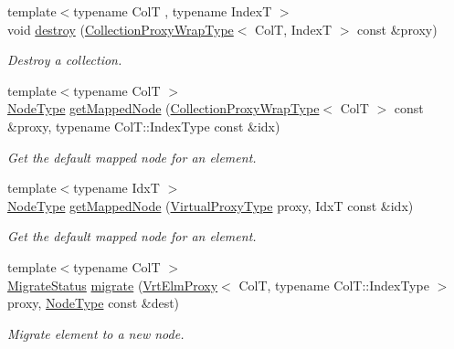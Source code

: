 \begin{DoxyCompactItemize}
{\footnotesize template$<$typename ColT , typename IndexT $>$ }\\void \hyperlink{structvt_1_1vrt_1_1collection_1_1_collection_manager_ae6e458293d04d8b29697fa0584c84c67}{destroy} (\hyperlink{structvt_1_1vrt_1_1collection_1_1_collection_manager_a56458ed7f9bb22b631b9b3a745f42f94}{Collection\+Proxy\+Wrap\+Type}$<$ ColT, IndexT $>$ const \&proxy)
\begin{DoxyCompactList}\small\item\em Destroy a collection. \end{DoxyCompactList}\item 
{\footnotesize template$<$typename ColT $>$ }\\\hyperlink{namespacevt_a866da9d0efc19c0a1ce79e9e492f47e2}{Node\+Type} \hyperlink{structvt_1_1vrt_1_1collection_1_1_collection_manager_ab92af61f5466dd4a1210bd6f2f1bb153}{get\+Mapped\+Node} (\hyperlink{structvt_1_1vrt_1_1collection_1_1_collection_manager_a56458ed7f9bb22b631b9b3a745f42f94}{Collection\+Proxy\+Wrap\+Type}$<$ ColT $>$ const \&proxy, typename Col\+T\+::\+Index\+Type const \&idx)
\begin{DoxyCompactList}\small\item\em Get the default mapped node for an element. \end{DoxyCompactList}\item 
{\footnotesize template$<$typename IdxT $>$ }\\\hyperlink{namespacevt_a866da9d0efc19c0a1ce79e9e492f47e2}{Node\+Type} \hyperlink{structvt_1_1vrt_1_1collection_1_1_collection_manager_a2356c42f2ca0effeca67b6bc2813fc29}{get\+Mapped\+Node} (\hyperlink{namespacevt_a1b417dd5d684f045bb58a0ede70045ac}{Virtual\+Proxy\+Type} proxy, IdxT const \&idx)
\begin{DoxyCompactList}\small\item\em Get the default mapped node for an element. \end{DoxyCompactList}\item 
{\footnotesize template$<$typename ColT $>$ }\\\hyperlink{namespacevt_1_1vrt_1_1collection_ad221ad8aea9e586689b4335f5bcd9804}{Migrate\+Status} \hyperlink{structvt_1_1vrt_1_1collection_1_1_collection_manager_aa78b0230c093abfbfc42629f36047c52}{migrate} (\hyperlink{structvt_1_1vrt_1_1collection_1_1_vrt_elm_proxy}{Vrt\+Elm\+Proxy}$<$ ColT, typename Col\+T\+::\+Index\+Type $>$ proxy, \hyperlink{namespacevt_a866da9d0efc19c0a1ce79e9e492f47e2}{Node\+Type} const \&dest)
\begin{DoxyCompactList}\small\item\em Migrate element to a new node. \end{DoxyCompactList}\item 

\end{DoxyCompactItemize}
